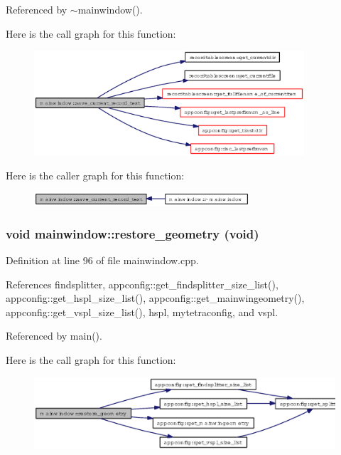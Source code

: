 Referenced by $\sim$mainwindow().

Here is the call graph for this function:\begin{figure}[H]
\begin{center}
\leavevmode
\includegraphics[width=285pt]{classmainwindow_5584aaad939eac61d3e5e9e09e666016_cgraph}
\end{center}
\end{figure}


Here is the caller graph for this function:\begin{figure}[H]
\begin{center}
\leavevmode
\includegraphics[width=227pt]{classmainwindow_5584aaad939eac61d3e5e9e09e666016_icgraph}
\end{center}
\end{figure}
\subsubsection{\setlength{\rightskip}{0pt plus 5cm}void mainwindow::restore\_\-geometry (void)}\label{classmainwindow_79369c37683c95e6e95928571e047100}




Definition at line 96 of file mainwindow.cpp.

References findsplitter, appconfig::get\_\-findsplitter\_\-size\_\-list(), appconfig::get\_\-hspl\_\-size\_\-list(), appconfig::get\_\-mainwingeometry(), appconfig::get\_\-vspl\_\-size\_\-list(), hspl, mytetraconfig, and vspl.

Referenced by main().

Here is the call graph for this function:\begin{figure}[H]
\begin{center}
\leavevmode
\includegraphics[width=332pt]{classmainwindow_79369c37683c95e6e95928571e047100_cgraph}
\end{center}
\end{figure}


